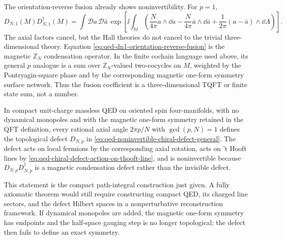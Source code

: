 The orientation-reverse fusion already shows noninvertibility.  For \(p=1\),
\begin{equation}
  D_{N,1}(M)D_{N,1}^\dagger(M)
  =
  \int\mathcal D a\,\mathcal D\bar a\,
  \exp\left[
  \ii\int_M
  \left(
    \frac{N}{4\pi}a\wedge\dd a
    -\frac{N}{4\pi}\bar a\wedge\dd\bar a
    +\frac{1}{2\pi}(a-\bar a)\wedge\dd A
  \right)
  \right].
  \label{eq:qed-dn1-orientation-reverse-fusion}
\end{equation}
The axial factors cancel, but the Hall theories do not cancel to the trivial
three-dimensional theory.  Equation
\eqref{eq:qed-dn1-orientation-reverse-fusion} is the magnetic
\(\mathbb Z_N\) condensation operator.  In the finite cochain language used
above, its general \(p\) analogue is a sum over \(\mathbb Z_N\)-valued
two-cocycles on \(M\), weighted by the Pontryagin-square phase and by the
corresponding magnetic one-form symmetry surface network.  Thus the fusion
coefficient is a three-dimensional TQFT or finite state sum, not a number.

\begin{construction}
\label{ca:qed-noninvertible-chiral-defects}
In compact unit-charge massless QED on oriented spin four-manifolds, with no
dynamical monopoles and with the magnetic one-form symmetry retained in the
QFT definition, every rational axial angle \(2\pi p/N\) with
\(\gcd(p,N)=1\) defines the topological defect
\(D_{N,p}\) in \eqref{eq:qed-noninvertible-chiral-defect-general}.  The defect
acts on local fermions by the corresponding axial rotation, acts on 't Hooft
lines by \eqref{eq:qed-chiral-defect-action-on-thooft-line}, and is
noninvertible because
\(D_{N,p}D_{N,p}^{\dagger}\) is a magnetic condensation defect rather than the
invisible defect.
\end{construction}

This statement is the compact path-integral construction just given.  A fully
axiomatic theorem would still require constructing compact
QED, its charged line sectors, and the defect Hilbert spaces in a
nonperturbative reconstruction framework.  If dynamical monopoles are added,
the magnetic one-form symmetry has endpoints and the half-space gauging step
is no longer topological; the defect then fails to define an exact symmetry.

